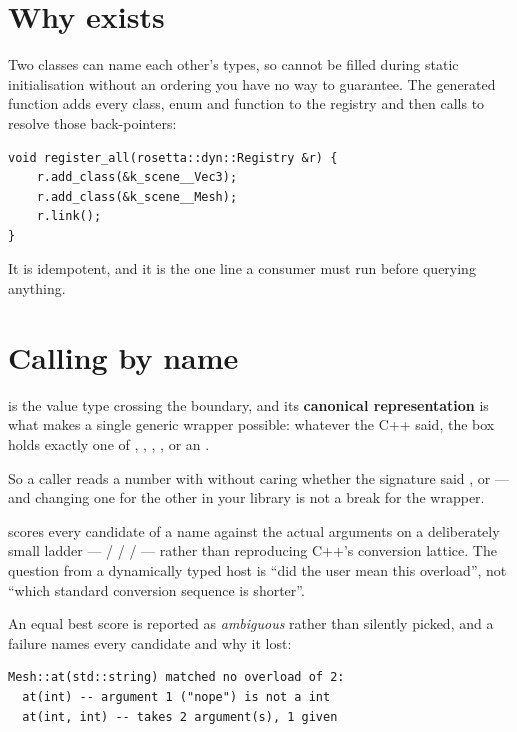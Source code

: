 \section{Why  exists}

Two classes can name each other's types, so  cannot be
filled during static initialisation without an ordering you have no way to
guarantee. The generated function adds every class, enum and function to the
registry and then calls  to resolve those back-pointers:

\begin{lstlisting}[style=cpp]
void register_all(rosetta::dyn::Registry &r) {
    r.add_class(&k_scene__Vec3);
    r.add_class(&k_scene__Mesh);
    r.link();
}
\end{lstlisting}

It is idempotent, and it is the one line a consumer must run before querying
anything.

\section{Calling by name}

 is the value type crossing the boundary, and its \textbf{canonical
representation} is what makes a single generic wrapper possible: whatever the
C++ said, the box holds exactly one of , ,
, ,  or an
.

So a caller reads a number with  without caring whether the
signature said ,  or  --- and changing
one for the other in your library is not a break for the wrapper.

 scores every candidate of a name against the actual arguments
on a deliberately small ladder ---  /  /
 /  --- rather than reproducing C++'s conversion
lattice. The question from a dynamically typed host is ``did the user mean this
overload'', not ``which standard conversion sequence is shorter''.

An equal best score is reported as \emph{ambiguous} rather than silently picked,
and a failure names every candidate and why it lost:

\begin{lstlisting}[style=plain]
Mesh::at(std::string) matched no overload of 2:
  at(int) -- argument 1 ("nope") is not a int
  at(int, int) -- takes 2 argument(s), 1 given
\end{lstlisting}

